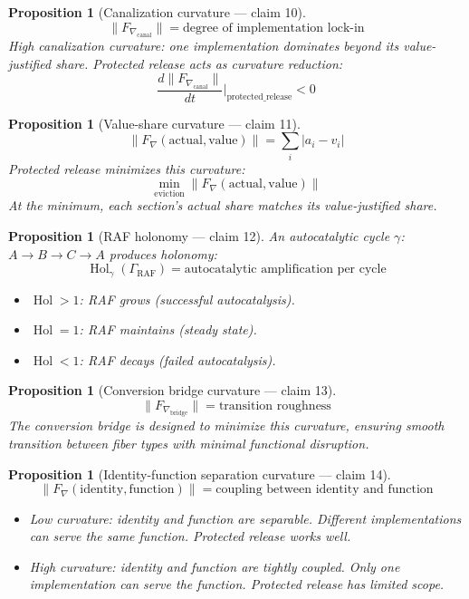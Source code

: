 \documentclass[11pt,a4paper]{article}
\newtheorem{proposition}[definition]{Proposition}
\begin{document}
\begin{proposition}[Canalization curvature --- claim 10]
\label{prop:canal}
\[
  \|F_{\nabla_{\text{canal}}}\| = \text{degree of implementation lock-in}
\]
High canalization curvature: one implementation dominates beyond its
value-justified share. Protected release acts as curvature reduction:
\[
  \frac{d\|F_{\nabla_{\text{canal}}}\|}{dt}\bigg|_{\text{protected\_release}} < 0
\]
\end{proposition}

\begin{proposition}[Value-share curvature --- claim 11]
\label{prop:value}
\[
  \|F_\nabla(\text{actual}, \text{value})\| = \sum_i |a_i - v_i|
\]
Protected release minimizes this curvature:
\[
  \min_{\text{eviction}} \|F_\nabla(\text{actual}, \text{value})\|
\]
At the minimum, each section's actual share matches its value-justified
share.
\end{proposition}

\begin{proposition}[RAF holonomy --- claim 12]
\label{prop:raf}
An autocatalytic cycle $\gamma$: $A \to B \to C \to A$ produces
holonomy:
\[
  \operatorname{Hol}_\gamma(\Gamma_{\text{RAF}}) = \text{autocatalytic
    amplification per cycle}
\]
\begin{itemize}
  \item $\operatorname{Hol} > 1$: RAF grows (successful autocatalysis).
  \item $\operatorname{Hol} = 1$: RAF maintains (steady state).
  \item $\operatorname{Hol} < 1$: RAF decays (failed autocatalysis).
\end{itemize}
\end{proposition}

\begin{proposition}[Conversion bridge curvature --- claim 13]
\label{prop:bridge_curv}
\[
  \|F_{\nabla_{\text{bridge}}}\| = \text{transition roughness}
\]
The conversion bridge is designed to minimize this curvature, ensuring
smooth transition between fiber types with minimal functional disruption.
\end{proposition}

\begin{proposition}[Identity-function separation curvature --- claim 14]
\label{prop:id_func}
\[
  \|F_\nabla(\text{identity}, \text{function})\| = \text{coupling between
    identity and function}
\]
\begin{itemize}
  \item Low curvature: identity and function are separable. Different
    implementations can serve the same function. Protected release
    works well.
  \item High curvature: identity and function are tightly coupled. Only
    one implementation can serve the function. Protected release has
    limited scope.
\end{itemize}
\end{proposition}
\end{document}
